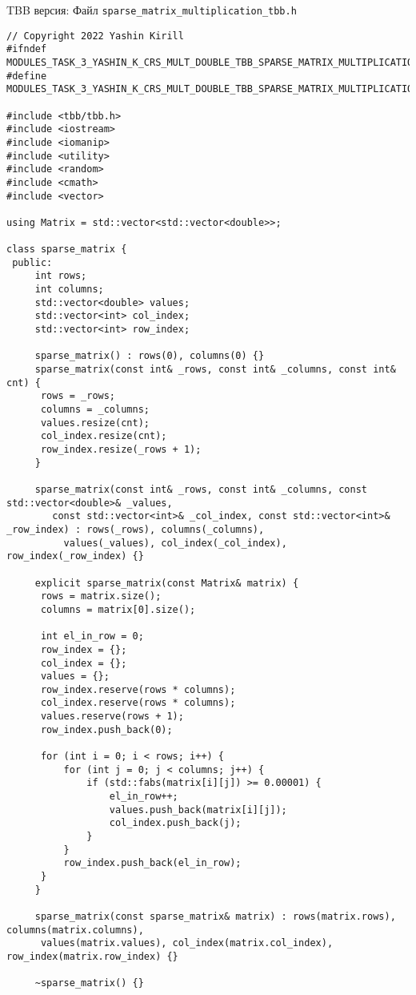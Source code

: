 \documentclass{report}
\begin{document}
TBB версия:
\newline
Файл \verb|sparse_matrix_multiplication_tbb.h|
\begin{lstlisting}
// Copyright 2022 Yashin Kirill
#ifndef MODULES_TASK_3_YASHIN_K_CRS_MULT_DOUBLE_TBB_SPARSE_MATRIX_MULTIPLICATION_TBB_H_
#define MODULES_TASK_3_YASHIN_K_CRS_MULT_DOUBLE_TBB_SPARSE_MATRIX_MULTIPLICATION_TBB_H_

#include <tbb/tbb.h>
#include <iostream>
#include <iomanip>
#include <utility>
#include <random>
#include <cmath>
#include <vector>

using Matrix = std::vector<std::vector<double>>;

class sparse_matrix {
 public:
     int rows;
     int columns;
     std::vector<double> values;
     std::vector<int> col_index;
     std::vector<int> row_index;

     sparse_matrix() : rows(0), columns(0) {}
     sparse_matrix(const int& _rows, const int& _columns, const int& cnt) {
      rows = _rows;
      columns = _columns;
      values.resize(cnt);
      col_index.resize(cnt);
      row_index.resize(_rows + 1);
     }

     sparse_matrix(const int& _rows, const int& _columns, const std::vector<double>& _values,
        const std::vector<int>& _col_index, const std::vector<int>& _row_index) : rows(_rows), columns(_columns),
          values(_values), col_index(_col_index), row_index(_row_index) {}

     explicit sparse_matrix(const Matrix& matrix) {
      rows = matrix.size();
      columns = matrix[0].size();

      int el_in_row = 0;
      row_index = {};
      col_index = {};
      values = {};
      row_index.reserve(rows * columns);
      col_index.reserve(rows * columns);
      values.reserve(rows + 1);
      row_index.push_back(0);

      for (int i = 0; i < rows; i++) {
          for (int j = 0; j < columns; j++) {
              if (std::fabs(matrix[i][j]) >= 0.00001) {
                  el_in_row++;
                  values.push_back(matrix[i][j]);
                  col_index.push_back(j);
              }
          }
          row_index.push_back(el_in_row);
      }
     }

     sparse_matrix(const sparse_matrix& matrix) : rows(matrix.rows), columns(matrix.columns),
      values(matrix.values), col_index(matrix.col_index), row_index(matrix.row_index) {}

     ~sparse_matrix() {}


\end{lstlisting}
\end{document}
